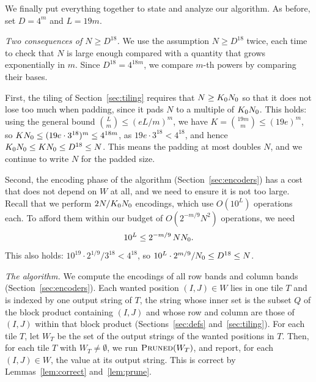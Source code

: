 We finally put everything together to state and analyze our algorithm. As before, set $D=4^m$ and $L=19m$.

\emph{Two consequences of $N\ge D^{18}$.} We use the assumption $N\ge D^{18}$ twice, each time to check that $N$ is large enough compared with a quantity that grows exponentially in $m$. Since $D^{18}=4^{18m}$, we compare $m$-th powers by comparing their bases. 

First, the tiling of Section~\ref{sec:tiling} requires that $N\ge K_0N_0$ so that it does not lose too much when padding, since it pads $N$ to a multiple of $K_0N_0$. This holds: using the general bound $\binom Lm\le(eL/m)^m$, we have $K=\binom{19m}m\le(19e)^m$, so $KN_0\le(19e\cdot3^{18})^m\le4^{18m}$, as $19e\cdot3^{18}<4^{18}$, and hence $K_0N_0\le KN_0\le D^{18}\le N$. This means the padding at most doubles $N$, and we continue to write $N$ for the padded size. 

Second, the encoding phase of the algorithm (Section~\ref{sec:encoders}) has a cost that does not depend on $W$ at all, and we need to ensure it is not too large. Recall that we perform $2N/K_0N_0$ encodings, which use $O(10^L)$ operations each. To afford them within our budget of $O(2^{-m/9}N^2)$ operations, we need \begin{equation}\label{eq:enchyp}
10^L\le2^{-m/9}\,NN_0.
\end{equation} This also holds: $10^{19}\cdot2^{1/9}/3^{18}<4^{18}$, so $10^L\cdot2^{m/9}/N_0\le D^{18}\le N$.


\emph{The algorithm.} We compute the encodings of all row bands and column bands (Section~\ref{sec:encoders}). Each wanted position $(I,J)\in W$ lies in one tile $T$ and is indexed by one output string of $T$, the string whose inner set is the subset $Q$ of the block product containing $(I,J)$ and whose row and column are those of $(I,J)$ within that block product (Sections~\ref{sec:defs} and~\ref{sec:tiling}). For each tile $T$, let $W_T$ be the set of the output strings of the wanted positions in $T$. Then, for each tile $T$ with $W_T\ne\emptyset$, we run $\textnormal{\textsc{Pruned}}(W_T)$, and report, for each $(I,J)\in W$, the value at its output string. This is correct by Lemmas~\ref{lem:correct} and~\ref{lem:prune}.

